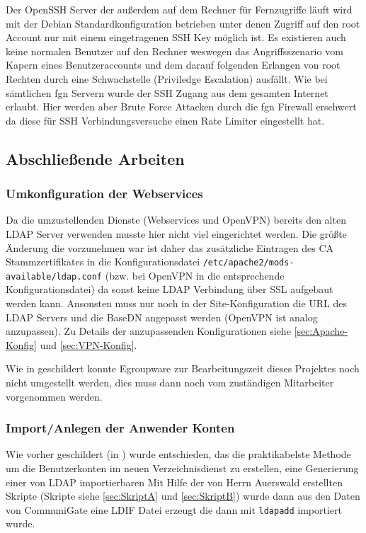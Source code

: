 \documentclass[11pt,a4paper,titlepage=firstiscover,headsepline]{scrartcl} %
\begin{document}
Der OpenSSH Server der außerdem auf dem Rechner für Fernzugriffe läuft wird mit der Debian Standardkonfiguration betrieben unter denen Zugriff auf den root Account nur mit einem eingetragenen SSH Key möglich ist. Es existieren auch keine normalen Benutzer auf den Rechner weswegen das Angriffsszenario vom Kapern eines Benutzeraccounts und dem darauf folgenden Erlangen von root Rechten durch eine Schwachstelle (Priviledge Escalation) ausfällt. Wie bei sämtlichen fgn Servern wurde der SSH Zugang aus dem gesamten Internet erlaubt. Hier werden aber Brute Force Attacken durch die fgn Firewall erschwert da diese für SSH Verbindungsversuche einen Rate Limiter eingestellt hat.

\subsection{Abschließende Arbeiten}
\subsubsection{Umkonfiguration der Webservices}
Da die umzustellenden Dienste (Webservices und OpenVPN) bereits den alten LDAP Server verwenden musste hier nicht viel eingerichtet werden. Die größte Änderung die vorzunehmen war ist daher das zusätzliche Eintragen des CA Stammzertifikates in die Konfigurationsdatei \texttt{/etc/apache2/mods-available/ldap.conf} (bzw. bei OpenVPN in die entsprechende Konfigurationsdatei) da sonst keine LDAP Verbindung über SSL aufgebaut werden kann. Ansonsten muss nur noch in der Site-Konfiguration die URL des LDAP Servers und die BaseDN angepasst werden (OpenVPN ist analog anzupassen). Zu Details der anzupassenden Konfigurationen siehe \autoref{sec:Apache-Konfig} und \autoref{sec:VPN-Konfig}.

Wie in  geschildert konnte Egroupware zur Bearbeitungszeit dieses Projektes noch nicht umgestellt werden, dies muss dann noch vom zuständigen Mitarbeiter vorgenommen werden.

\subsubsection{Import/Anlegen der Anwender Konten}
Wie vorher geschildert (in ) wurde entschieden, das die praktikabelste Methode um die Benutzerkonten im neuen Verzeichnisdienst zu erstellen, eine Generierung einer von LDAP importierbaren 
Mit Hilfe der von Herrn Auerswald erstellten Skripte (Skripte siehe \autoref{sec:SkriptA} und \autoref{sec:SkriptB}) wurde dann aus den Daten von CommuniGate eine LDIF Datei erzeugt die dann mit \texttt{ldapadd} importiert wurde.
\end{document}
